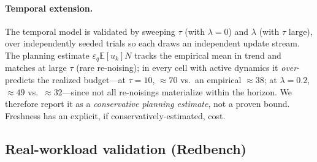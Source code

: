 \documentclass[sigconf,nonacm]{acmart}
\newcommand{\eps}{\varepsilon}
\newcommand{\E}{\mathbb{E}}
\begin{document}
\paragraph{Temporal extension.}
The temporal model is validated by sweeping $\tau$ (with $\lambda{=}0$) and $\lambda$ (with $\tau$ large), over independently seeded trials so each draws an independent update stream. The planning estimate $\eps_q\E[u_k]N$ tracks the empirical mean in trend and matches at large $\tau$ (rare re-noising); in every cell with active dynamics it \emph{over}-predicts the realized budget---at $\tau{=}10$, ${\approx}70$ vs.\ an empirical ${\approx}38$; at $\lambda{=}0.2$, ${\approx}49$ vs.\ ${\approx}32$---since not all re-noisings materialize within the horizon. We therefore report it as a \emph{conservative planning estimate}, not a proven bound. Freshness has an explicit, if conservatively-estimated, cost.

\subsection{Real-workload validation (Redbench)}
\label{sec:redbench}
\end{document}
